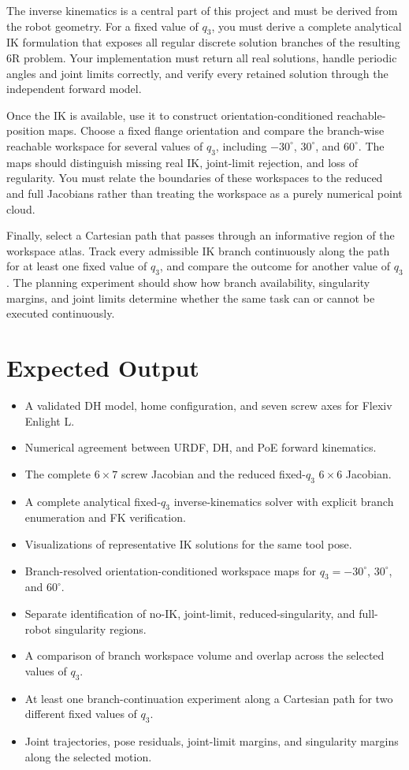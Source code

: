 \documentclass[11pt,a4paper]{article}
\begin{document}
The inverse kinematics is a central part of this project and must be derived from the robot geometry. For a fixed value of $q_3$, you must derive a complete analytical IK formulation that exposes all regular discrete solution branches of the resulting 6R problem. Your implementation must return all real solutions, handle periodic angles and joint limits correctly, and verify every retained solution through the independent forward model.

Once the IK is available, use it to construct orientation-conditioned reachable-position maps. Choose a fixed flange orientation and compare the branch-wise reachable workspace for several values of $q_3$, including $-30^\circ$, $30^\circ$, and $60^\circ$. The maps should distinguish missing real IK, joint-limit rejection, and loss of regularity. You must relate the boundaries of these workspaces to the reduced and full Jacobians rather than treating the workspace as a purely numerical point cloud.

Finally, select a Cartesian path that passes through an informative region of the workspace atlas. Track every admissible IK branch continuously along the path for at least one fixed value of $q_3$, and compare the outcome for another value of $q_3$. The planning experiment should show how branch availability, singularity margins, and joint limits determine whether the same task can or cannot be executed continuously.

\section*{Expected Output}
\begin{itemize}
  \item A validated DH model, home configuration, and seven screw axes for Flexiv Enlight L.
  \item Numerical agreement between URDF, DH, and PoE forward kinematics.
  \item The complete $6\times7$ screw Jacobian and the reduced fixed-$q_3$ $6\times6$ Jacobian.
  \item A complete analytical fixed-$q_3$ inverse-kinematics solver with explicit branch enumeration and FK verification.
  \item Visualizations of representative IK solutions for the same tool pose.
  \item Branch-resolved orientation-conditioned workspace maps for $q_3=-30^\circ$, $30^\circ$, and $60^\circ$.
  \item Separate identification of no-IK, joint-limit, reduced-singularity, and full-robot singularity regions.
  \item A comparison of branch workspace volume and overlap across the selected values of $q_3$.
  \item At least one branch-continuation experiment along a Cartesian path for two different fixed values of $q_3$.
  \item Joint trajectories, pose residuals, joint-limit margins, and singularity margins along the selected motion.
\end{itemize}
\end{document}
